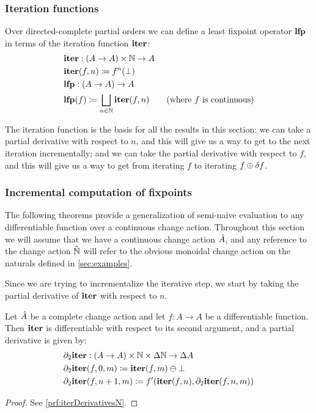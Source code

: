 \subsubsection{Iteration functions}
\label{sec:iteration}

Over directed-complete partial orders we can define a least fixpoint operator
$\mathbf{lfp}$ in terms of the
iteration function $\mathbf{iter}$:
\begin{align*}
  &\mathbf{iter} : (A \rightarrow A) \times \mathbb{N} \rightarrow A\\
  &\mathbf{iter}(f, n) \coloneqq f^n(\bot)\\
  &\mathbf{lfp} : (A \rightarrow A) \rightarrow A\\
  &\mathbf{lfp}(f) \coloneqq \bigsqcup_{n \in \mathbb{N}} \mathbf{iter}(f, n) \tag{where $f$ is continuous}
\end{align*}

The iteration function is the basis for all the results in this section:
we can take a partial derivative with respect to $n$, and this will give us a way to get
to the next iteration incrementally; and we can take the partial derivative
with respect to $f$, and this will give us a way to get from iterating $f$ to iterating $f
\oplus \delta f$.

\subsubsection{Incremental computation of fixpoints}

The following theorems provide a
generalization of semi-naive evaluation to any differentiable function over a
continuous change action. Throughout this section we will assume that we have a continuous change action
$\hat{A}$, and any reference to the change action $\hat{\mathbb{N}}$ will refer to the obvious monoidal
change action on the naturals defined in \cref{sec:examples}.

Since we are trying to incrementalize the iterative step, we start by taking the partial
derivative of $\mathbf{iter}$ with respect to $n$.

\begin{prop}[name=Derivative of the iteration map with respect to $n$, restate=iterDerivativesN]
  \label{prop:iterDerivativesN}
  Let $\hat{A}$ be a complete change action and let $f: A \rightarrow A$ be a differentiable function. 
  Then $\mathbf{iter}$ is differentiable with respect to its second
  argument, and a partial derivative is given by:
  \begin{align*}
    &\partial_2{\mathbf{iter}}: (A \rightarrow A) \times \mathbb{N} \times \Delta \mathbb{N} \rightarrow \Delta A\\
    &\partial_2{\mathbf{iter}}(f, 0, m) \coloneqq \mathbf{iter}(f, m) \ominus \bot\\
    &\partial_2{\mathbf{iter}}(f, n+1, m) \coloneqq f'(\mathbf{iter}(f, n), \partial_2{\mathbf{iter}}(f, n, m))
  \end{align*}
\end{prop}
\ifproofs
\begin{proof}
  See \cref{prf:iterDerivativesN}.
\end{proof}
\fi

